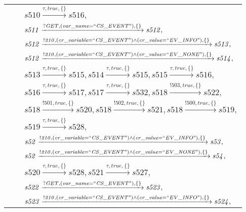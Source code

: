 \begin{tabular}{lcp{350px}}
\end{tabular}

\begin{tabular}{lcp{350px}}
& & $\mathit{s510}\xrightarrow{\mathit{\tau}, \mathit{true}, \{\}}\mathit{s516},$ \\
& & $\mathit{s511}\xrightarrow{\mathit{?GET}, \mathit{(var\_name = ``CS\_EVENT")}, \{\}}\mathit{s512},$ \\
& & $\mathit{s512}\xrightarrow{\mathit{!210}, \mathit{(cr\_variable = ``CS\_EVENT") \land (cr\_value = ``EV\_INFO")}, \{\}}\mathit{s513},$ \\
& & $\mathit{s512}\xrightarrow{\mathit{!210}, \mathit{(cr\_variable = ``CS\_EVENT") \land (cr\_value = ``EV\_NONE")}, \{\}}\mathit{s514},$ \\
& & $\mathit{s513}\xrightarrow{\mathit{\tau}, \mathit{true}, \{\}}\mathit{s515},\mathit{s514}\xrightarrow{\mathit{\tau}, \mathit{true}, \{\}}\mathit{s515},\mathit{s515}\xrightarrow{\mathit{\tau}, \mathit{true}, \{\}}\mathit{s516},$ \\
& & $\mathit{s516}\xrightarrow{\mathit{\tau}, \mathit{true}, \{\}}\mathit{s517},\mathit{s517}\xrightarrow{\mathit{\tau}, \mathit{true}, \{\}}\mathit{s532},\mathit{s518}\xrightarrow{\mathit{!503}, \mathit{true}, \{\}}\mathit{s522},$ \\
& & $\mathit{s518}\xrightarrow{\mathit{!501}, \mathit{true}, \{\}}\mathit{s520},\mathit{s518}\xrightarrow{\mathit{!502}, \mathit{true}, \{\}}\mathit{s521},\mathit{s518}\xrightarrow{\mathit{!500}, \mathit{true}, \{\}}\mathit{s519},$ \\
& & $\mathit{s519}\xrightarrow{\mathit{\tau}, \mathit{true}, \{\}}\mathit{s528},$ \\
& & $\mathit{s52}\xrightarrow{\mathit{!210}, \mathit{(cr\_variable = ``CS\_EVENT") \land (cr\_value = ``EV\_INFO")}, \{\}}\mathit{s53},$ \\
& & $\mathit{s52}\xrightarrow{\mathit{!210}, \mathit{(cr\_variable = ``CS\_EVENT") \land (cr\_value = ``EV\_NONE")}, \{\}}\mathit{s54},$ \\
& & $\mathit{s520}\xrightarrow{\mathit{\tau}, \mathit{true}, \{\}}\mathit{s528},\mathit{s521}\xrightarrow{\mathit{\tau}, \mathit{true}, \{\}}\mathit{s527},$ \\
& & $\mathit{s522}\xrightarrow{\mathit{?GET}, \mathit{(var\_name = ``CS\_EVENT")}, \{\}}\mathit{s523},$ \\
& & $\mathit{s523}\xrightarrow{\mathit{!210}, \mathit{(cr\_variable = ``CS\_EVENT") \land (cr\_value = ``EV\_INFO")}, \{\}}\mathit{s524},$ \\

\end{tabular}
